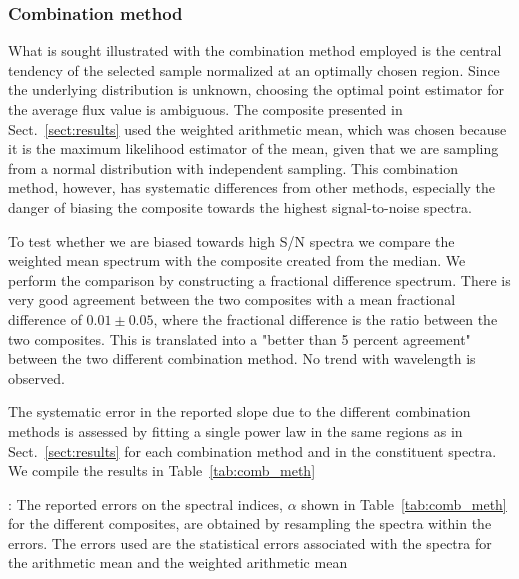 \documentclass{aa}    %
\newcommand{\Tab}[1]{Table~\ref{tab:#1}}
\newcommand{\tab}[1]{\Tab{#1}}
\newcommand{\sectionname}{Sect.}
\newcommand{\Sect}[1]{\sectionname~\ref{sect:#1}}
\newcommand{\sect}[1]{\Sect{#1}}
\newcommand{\sectlabel}[1]{\label{sect:#1}}
\newcommand{\todo}[3]{{\color{#2}\emph{#1}: #3}}
\newcommand{\changed}[1]{\todo{}{green}{#1}}
\begin{document}
{%
\subsubsection{Combination method}  \sectlabel{Combination method}
What is sought illustrated with the combination method employed is the central tendency of the selected sample normalized at an optimally chosen region. Since the underlying distribution is unknown, choosing the optimal point estimator for the average flux value is ambiguous. The composite presented in \sect{results} used the weighted arithmetic mean, which was chosen because it is the maximum likelihood estimator of the mean, given that we are sampling from a normal distribution with independent sampling. This combination method, however, has systematic differences from other methods, especially the danger of biasing the composite towards the highest signal-to-noise spectra. 

To test whether we are biased towards high S/N spectra we compare the weighted mean spectrum with the composite created from the median. We perform the comparison by constructing a fractional difference spectrum. There is very good agreement between the two composites with a mean fractional difference of $0.01 \pm 0.05$, where the fractional difference is the ratio between the two composites. This is translated into a "better than 5 percent agreement" between the two different combination method. No trend with wavelength is observed.

The systematic error in the reported slope due to the different combination methods is assessed by fitting a single power law in the same regions as in \sect{results} for each combination method and in the constituent spectra. We compile the results in \tab{comb_meth}

 

\changed{
The reported errors on the spectral indices, $\alpha$ shown in \tab{comb_meth} for the different composites, are obtained by resampling the spectra within the errors. The errors used are the statistical errors associated with the spectra for the arithmetic mean and the weighted  arithmetic mean


}}
\end{document}
